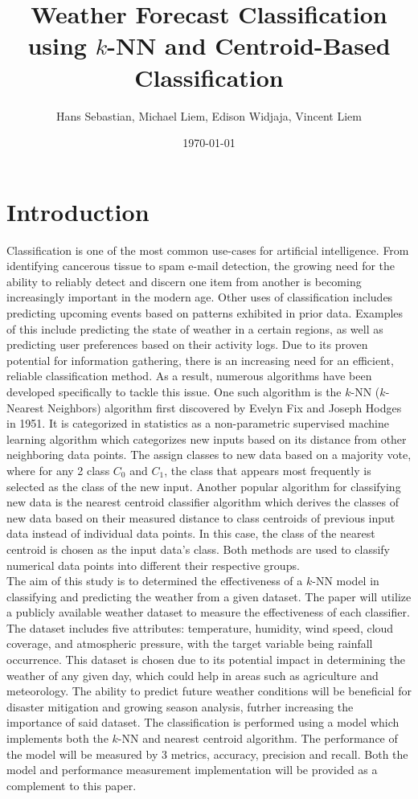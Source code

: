\documentclass[twocolumn, a4paper, 8pt]{article}
\title{\fontsize{20pt}{24pt}\selectfont Weather Forecast Classification using $k$-NN and Centroid-Based Classification}
\author{Hans Sebastian, Michael Liem, Edison Widjaja, Vincent Liem}
\date{\today}
\newcommand{\sups}[1]{\textsuperscript{#1}}
\begin{document}
	\maketitle
	\section{Introduction}
	
	Classification is one of the most common use-cases for artificial intelligence. From identifying cancerous tissue to spam e-mail detection, the growing need for the ability to reliably detect and discern one item from another is becoming increasingly important in the modern age. Other uses of classification includes predicting upcoming events based on patterns exhibited in prior data. Examples of this include predicting the state of weather in a certain regions, as well as predicting user preferences based on their activity logs. Due to its proven potential for information gathering, there is an increasing need for an efficient, reliable classification method.
	As a result, numerous algorithms have been developed specifically to tackle this issue. One such algorithm is the $k$-NN ($k$-Nearest Neighbors) algorithm first discovered by Evelyn Fix and Joseph Hodges in 1951\sups{\cite{fix_1989_discriminatory}}. It is categorized in statistics as a non-parametric\sups{\cite{grant_2022_how}} supervised machine learning\sups{\cite{googlecloud_what}} algorithm which categorizes new inputs based on its distance from other neighboring data points. The assign classes to new data based on a majority vote, where for any 2 class $C_0$ and $C_1$, the class that appears most frequently is selected as the class of the new input. Another popular algorithm for classifying new data is the nearest centroid classifier algorithm which derives the classes of new data based on their measured distance to class centroids of previous input data instead of individual data points\sups{\cite{BELLOTTI2014115}}. In this case, the class of the nearest centroid is chosen as the input data's class. Both methods are used to classify numerical data points into different their respective groups.\\
	
	The aim of this study is to determined the effectiveness of a $k$-NN model in classifying and predicting the weather from a given dataset. The paper will utilize a publicly available weather dataset to measure the effectiveness of each classifier. The dataset includes five attributes: temperature, humidity, wind speed, cloud coverage, and atmospheric pressure, with the target variable being rainfall occurrence. This dataset is chosen due to its potential impact in determining the weather of any given day, which could help in areas such as agriculture and meteorology. The ability to predict future weather conditions will be beneficial for disaster mitigation and growing season analysis, futrher increasing the importance of said dataset. The classification is performed using a model which implements both the $k$-NN and nearest centroid algorithm. The performance of the model will be measured by 3 metrics, accuracy, precision and recall. Both the model and performance measurement implementation will be provided as a complement to this paper.
	
\end{document}
